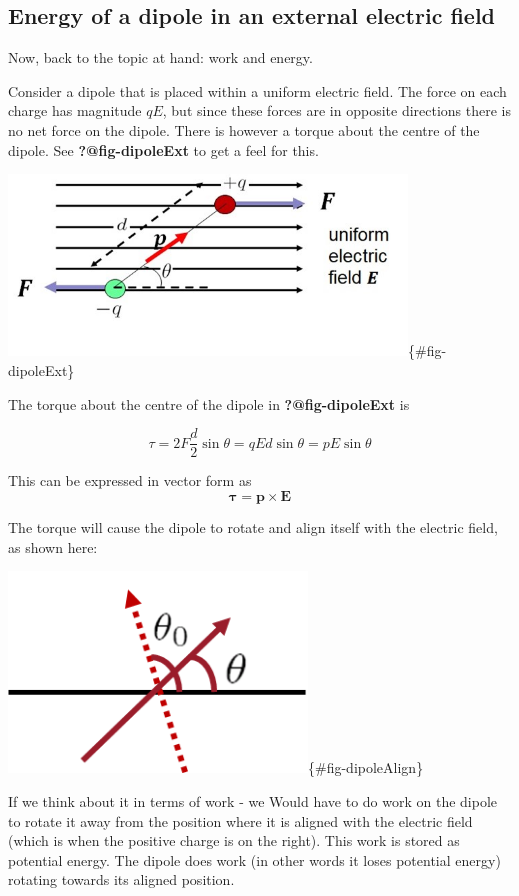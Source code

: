 \documentclass[
  letterpaper,
  DIV=11,
  numbers=noendperiod]{scrreprt}
\begin{document}
\subsection{Energy of a dipole in an external electric
field}\label{energy-of-a-dipole-in-an-external-electric-field}

Now, back to the topic at hand: work and energy.

Consider a dipole that is placed within a uniform electric field. The
force on each charge has magnitude \(qE\), but since these forces are in
opposite directions there is no net force on the dipole. There is
however a torque about the centre of the dipole. See
\textbf{?@fig-dipoleExt} to get a feel for this.

\includegraphics[width=4.16667in,height=\textheight]{Figures/dipole_extE.jpg}\{\#fig-dipoleExt\}

The torque about the centre of the dipole in \textbf{?@fig-dipoleExt} is

\[ \tau = 2 F \frac{d}{2} \sin\theta = qEd\sin\theta = p E \sin\theta \]

This can be expressed in vector form as
\[ \mathrm{\mathbf{\tau}} = \mathrm{\mathbf{p}}\times \mathrm{\mathbf{E}}\]

The torque will cause the dipole to rotate and align itself with the
electric field, as shown here:

\includegraphics[width=3.125in,height=\textheight]{Figures/dipole_align.png}\{\#fig-dipoleAlign\}

If we think about it in terms of work - we Would have to do work on the
dipole to rotate it away from the position where it is aligned with the
electric field (which is when the positive charge is on the right). This
work is stored as potential energy. The dipole does work (in other words
it loses potential energy) rotating towards its aligned position.
\end{document}
